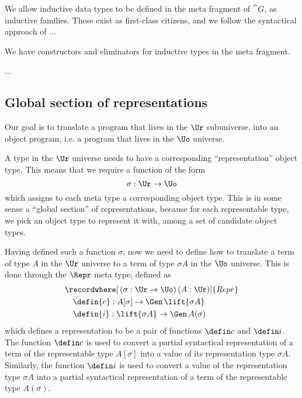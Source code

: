 We allow inductive data types to be defined in the meta fragment of $\cat{G}$,
as inductive families. These exist as first-class citizens, and we follow the
syntactical approach of \cite{Dybjer1994-zx} ...

We have constructors and eliminators for inductive types in the meta fragment.

...

\subsection{Global section of representations}

Our goal is to translate a program that lives in the $\Ur$ subuniverse, into an
object program, i.e. a program that lives in the $\Uo$ universe.

A type in the $\Ur$ universe needs to have a corresponding ``representation''
object type. This means that we require a function of the form
\[
  \sigma : \Ur \to \Uo
\]
which assigns to each meta type a corresponding object type. This is in some
sense a ``global section'' of representations, because for each representable
type, we pick an object type to represent it with, among a set of candidate
object types.


Having defined such a function $\sigma$, now we need to define how to translate
a term of type $A$ in the $\Ur$ universe to a term of type $\sigma A$ in the
$\Uo$ universe. This is done through the $\Repr$ meta type, defined as
\begin{align*}
   & \recordwhere[\,(\sigma : \Ur \to \Uo)\,(A: \Ur)]{Repr}           \\
   & \quad    \defin{c} : A[\sigma] \to \Gen \, \lift{\sigma A} \quad \\
   & \quad    \defin{i} : \lift{\sigma A} \to \Gen \, A(\sigma)
\end{align*}
which defines a representation to be a pair of functions $\defin c$ and
$\defin i$. The function $\defin c$ is used to convert a partial syntactical
representation of a term of the representable type $A[\sigma]$ into a value of its
representation type $\sigma A$. Similarly, the function $\defin i$ is used to
convert a value of the representation type $\sigma A$ into a partial syntactical
representation of a term of the representable type $A(\sigma)$.

